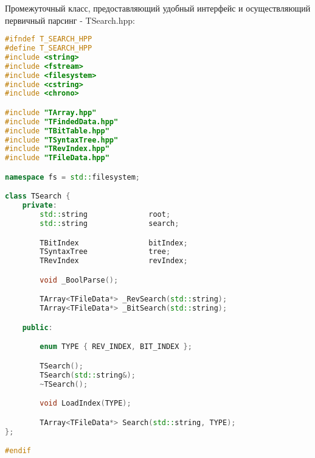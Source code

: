 Промежуточный класс, предоставляющий удобный интерфейс и осуществляющий первичный парсинг - TSearch.hpp:
\begin{lstlisting}[language=C++]
#ifndef T_SEARCH_HPP
#define T_SEARCH_HPP
#include <string>
#include <fstream>
#include <filesystem>
#include <cstring>
#include <chrono>

#include "TArray.hpp"
#include "TFindedData.hpp"
#include "TBitTable.hpp"
#include "TSyntaxTree.hpp"
#include "TRevIndex.hpp"
#include "TFileData.hpp"

namespace fs = std::filesystem;

class TSearch {
    private:
        std::string              root;
        std::string              search;

        TBitIndex                bitIndex;
        TSyntaxTree              tree;
        TRevIndex                revIndex;

        void _BoolParse();

        TArray<TFileData*> _RevSearch(std::string);
        TArray<TFileData*> _BitSearch(std::string);

    public:

        enum TYPE { REV_INDEX, BIT_INDEX };

        TSearch();
        TSearch(std::string&);
        ~TSearch();

        void LoadIndex(TYPE);

        TArray<TFileData*> Search(std::string, TYPE);
};

#endif
\end{lstlisting}

